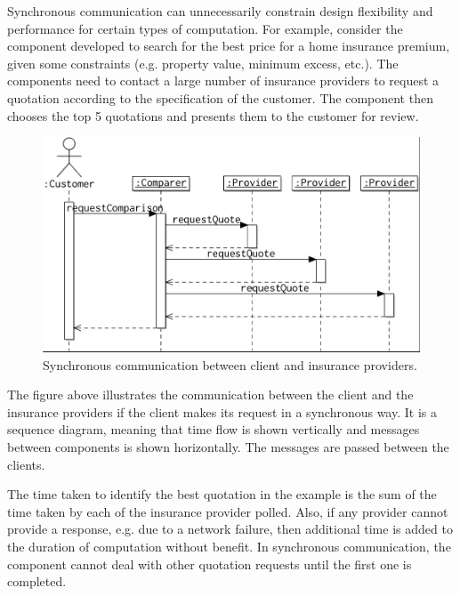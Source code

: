 \documentclass[a4paper, openany]{memoir}
\begin{document}
Synchronous communication can unnecessarily constrain design flexibility and performance for certain types of computation. For example, consider the component developed to search for the best price for a home insurance premium, given some constraints (e.g. property value, minimum excess, etc.). The components need to contact a large number of insurance providers to request a quotation according to the specification of the customer. The component then chooses the top 5 quotations and presents them to the customer for review.
\begin{figure}[H]
    \centering
    \includegraphics[scale=0.4]{src/14.7 insurance 1.png}
    \caption{Synchronous communication between client and insurance providers.}
\end{figure}

The figure above illustrates the communication between the client and the insurance providers if the client makes its request in a synchronous way. It is a sequence diagram, meaning that time flow is shown vertically and messages between components is shown horizontally. The messages are passed between the clients.

The time taken to identify the best quotation in the example is the sum of the time taken by each of the insurance provider polled. Also, if any provider cannot provide a response, e.g. due to a network failure, then additional time is added to the duration of computation without benefit. In synchronous communication, the component cannot deal with other quotation requests until the first one is completed.
\end{document}
